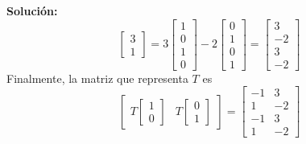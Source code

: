 \documentclass[12pt]{article}
\newenvironment{solucion}
{\begin{mdframed}[backgroundcolor=black!10]
		{\bf Solución:}\\
	}
	{
	\end{mdframed}
}
\newenvironment{preguntas}
{\begin{enumerate}\itemsep12pt
	}
	{
	\end{enumerate}
}
\begin{document}
\begin{preguntas}
\begin{solucion}
$$\begin{bmatrix}
		3 \\ 1
		\end{bmatrix} = 3 \begin{bmatrix}1 \\ 0 \\ 1 \\ 0\end{bmatrix} - 2 \begin{bmatrix}0 \\ 1 \\ 0 \\ 1\end{bmatrix} = \begin{bmatrix}3 \\ -2 \\ 3 \\ -2\end{bmatrix}$$
		Finalmente, la matriz que representa $T$ es
		$$\begin{bmatrix}
		T\begin{bmatrix}
		1 \\ 0
		\end{bmatrix}
		&
		
		T\begin{bmatrix}
		0 \\ 1
		\end{bmatrix}
		\end{bmatrix} =
		\begin{bmatrix}
		-1 & 3 \\
		1 & -2 \\
		-1 & 3 \\
		1 & -2
		\end{bmatrix}$$
\end{solucion}
\end{preguntas}
\end{document}
